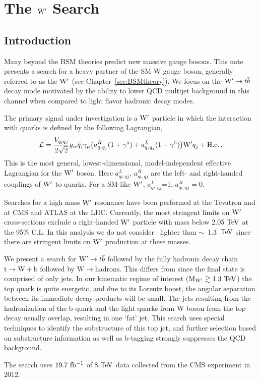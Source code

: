 
\chapter{The $\mathrm{W}^\prime$ Search}
\section{Introduction}
\label{sec:introduction}

Many beyond the BSM theories predict new massive
gauge bosons.  This note presents a search for a heavy partner of
the SM W gauge boson, generally referred to as the
$\mathrm{W}^\prime$ (see Chapter~\ref{sec:BSMtheory}).  
We focus on the $\mathrm{W}^\prime \to {t\overline{b}}$ decay mode motivated by the ability to lower QCD multijet background in this channel when compared to light flavor hadronic decay modes. 


The primary signal under investigation is a $\mathrm{W}^\prime$ particle in which the interaction with quarks 
is defined by the following Lagrangian,
\begin{eqnarray}
{\cal L} = \frac{V_{q_iq_j}}{2\sqrt{2}} g_w \overline{q}_i\gamma_\mu 
\bigl( a^R_{q_iq_j} (1+{\gamma}^5) + a^L_{q_iq_j}
(1-{\gamma}^5)\bigr) {\wpr} q_j + \mathrm{H.c.} \,,
\label{eqn:Lag}
\end{eqnarray}
This is the most general, lowest-dimensional, model-independent
effective Lagrangian for the $\mathrm{W}^\prime$ boson.  Here $a_{qi,qj}^{L}$,
$a_{qi,qj}^{R}$ are the left- and right-handed couplings of $\mathrm{W}^\prime$ to quarks.
For a SM-like $\mathrm{W}^\prime$, $a_{qi,qj}^{L}$=1, $a_{qi,qj}^{R}=0$.


Searches for a high mass $\mathrm{W}^\prime$ resonance have been performed at the
Tevatron \cite{PhysRevLett.100.211803,Abazov2011145} and at CMS \cite{CMS-PAS-B2G-12-010,CMS-PAS-EXO-12-060,CMS-PAS-EXO-12-025} and ATLAS \cite{PhysRevLett.109.081801} at the LHC.  
Currently, the most stringent limits on $\mathrm{W}^\prime$ cross-sections exclude a right-handed $\mathrm{W}^\prime$ particle with mass below 2.05$~\mathrm{TeV}$ at the 95\% C.L. In this analysis we do not consider \wpr\
  lighter than $\sim$~1.3~$\mathrm{TeV}$ since there are stringent limits on $\mathrm{W}^\prime$ production at these masses.  

We present a search for $\mathrm{W}^\prime \to {t\overline{b}}$ followed by the
fully hadronic decay chain $\mathrm{t \to W+b}$ followed by $\mathrm{W \to hadrons}$.
This differs from \cite{CMS-PAS-B2G-12-010} since the final state is
comprised of only jets.  In our kinematic regime of interest ($\mathrm{M_{\mathrm{W}^\prime}
\gtrsim 1.3~\mathrm{TeV}}$) the top quark is quite energetic, and due to its Lorentz
boost, the angular separation between its immediate decay products will
be small.  The jets resulting from the hadronization of the b quark
and the light quarks from W boson from the top decay usually overlap, resulting in one
`fat' jet.  This search uses special techniques to identify the
substructure of this top jet, and further selection based on
substructure information as well as b-tagging strongly suppresses the
QCD background.

The search uses $19.7~\mathrm{fb^{-1}}$ of 8$~\mathrm{TeV}$ data collected from
the CMS experiment in 2012.
